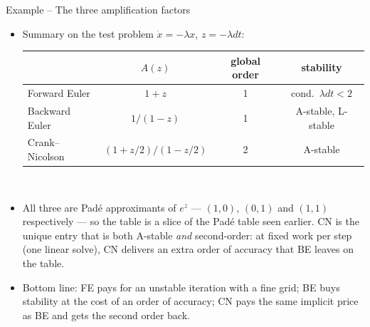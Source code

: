 \documentclass[11pt,aspectratio=169]{beamer}
\begin{document}
\begin{frame}{Example -- The three amplification factors}

\begin{itemize}

\item Summary on the test problem $\dot x = -\lambda x$, $z=-\lambda dt$:
  \begin{center}
    \small
    \renewcommand{\arraystretch}{1.4}
    \begin{tabular}{lccc}
      \toprule
       & $A(z)$ & global order & stability \\
      \midrule
      Forward Euler  & $1+z$               & 1 & cond.\ $\lambda dt < 2$ \\
      Backward Euler & $1/(1-z)$           & 1 & A-stable, L-stable \\
      Crank--Nicolson & $(1+z/2)/(1-z/2)$ & 2 & A-stable \\
      \bottomrule
    \end{tabular}
  \end{center}
  ~\newline

\item All three are Padé approximants of $e^z$ — $(1,0)$, $(0,1)$ and
  $(1,1)$ respectively — so the table is a slice of the Padé table
  seen earlier. CN is the unique entry that is both A-stable
  \emph{and} second-order: at fixed work per step (one linear solve),
  CN delivers an extra order of accuracy that BE leaves on the
  table.\newline

\item Bottom line: FE pays for an unstable iteration with a fine
  grid; BE buys stability at the cost of an order of accuracy; CN
  pays the same implicit price as BE and gets the second order back.

\end{itemize}

\end{frame}
\end{document}
